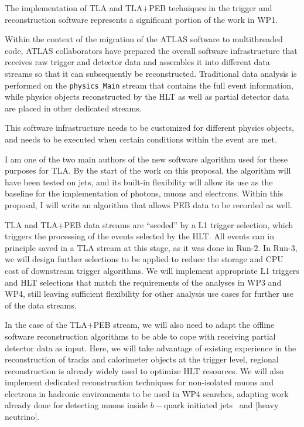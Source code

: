 The implementation of TLA and TLA+PEB techniques in the trigger and reconstruction software represents a significant portion of the work in WP1. 

Within the context of the migration of the ATLAS software to multithreaded code, ATLAS collaborators have prepared the overall software infrastructure that receives raw trigger and detector data and assembles it into different data streams so that it can subsequently be reconstructed. 
Traditional data analysis is performed on the \texttt{physics_Main} stream that contains the full event information, while physics objects reconstructed by the HLT as well as partial detector data are placed in other dedicated streams. 

This software infrastructure needs to be customized for different physics objects, and needs to be executed when certain conditions within the event are met. 

I am one of the two main authors of the new software algorithm used for these purposes for TLA. By the start of the work on this proposal, the algorithm will have been tested on jets, and its built-in flexibility will allow its use as the baseline for the implementation of photons, muons and electrons. Within this proposal, I will write an algorithm that allows PEB data to be recorded as well.  

TLA and TLA+PEB data streams are “seeded” by a L1 trigger selection, which triggers the processing of the events selected by the HLT. All events can in principle saved in a TLA stream at this stage, as it was done in Run-2. In Run-3, we will design further selections to be applied to reduce the storage and CPU cost of downstream trigger algorithms. 
We will implement appropriate L1 triggers and HLT selections that match the requirements of the analyses in WP3 and WP4, still leaving sufficient flexibility for other analysis use cases for further use of the data streams. 


In the case of the TLA+PEB stream, we will also need to adapt the offline software reconstruction algorithms to be able to cope with receiving partial detector data as input. 
Here, we will take advantage of existing experience in the reconstruction of tracks and calorimeter objects at the trigger level, regional reconstruction is already widely used to optimize HLT resources.
We will also implement dedicated reconstruction techniques for non-isolated muons and electrons in hadronic environments to be used in WP4 searches, adapting work already done for detecting muons inside $b-$quark initiated jets~\cite{MuonInJet} and  [heavy neutrino]. 